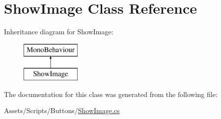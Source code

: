 \hypertarget{class_show_image}{}\section{Show\+Image Class Reference}
\label{class_show_image}
Inheritance diagram for Show\+Image\+:\begin{figure}[H]
\begin{center}
\leavevmode
\includegraphics[height=2.000000cm]{class_show_image}
\end{center}
\end{figure}


The documentation for this class was generated from the following file\+:\begin{DoxyCompactItemize}
\item 
Assets/\+Scripts/\+Buttons/\mbox{\hyperlink{_show_image_8cs}{Show\+Image.\+cs}}\end{DoxyCompactItemize}
